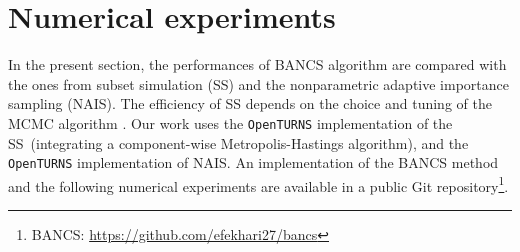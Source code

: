 
%



\section{Numerical experiments}\label{sec:bancs_bench}

In the present section, the performances of BANCS algorithm are compared with the ones from subset simulation (SS) and the nonparametric adaptive importance sampling (NAIS). 
The efficiency of SS depends on the choice and tuning of the MCMC algorithm \citep{Papaioannou_PEM_2015}. 
Our work uses the \texttt{OpenTURNS} implementation of the SS\footnotemark~(integrating a component-wise Metropolis-Hastings algorithm), 
and the \texttt{OpenTURNS} implementation of NAIS\footnotemark. 
An implementation of the BANCS method and the following numerical experiments are available in a public Git repository\footnote{BANCS: \url{https://github.com/efekhari27/bancs}}. 

